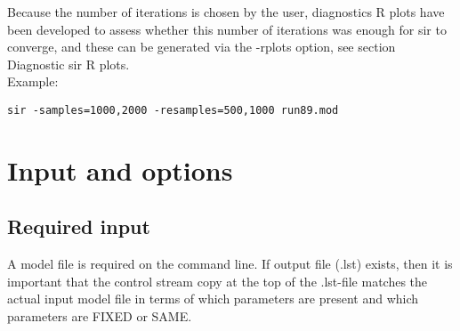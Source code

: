 Because the number of iterations is chosen by the user, diagnostics R plots have been developed to assess whether this number of iterations was enough for sir to converge, and these can be generated via the -rplots option, see section Diagnostic sir R plots.\\
Example:
\begin{verbatim}
sir -samples=1000,2000 -resamples=500,1000 run89.mod
\end{verbatim}

\section{Input and options}
\subsection{Required input}
A model file is required on the command line. If output file (.lst) exists, then it is important that the control stream copy at the top of the .lst-file matches the actual input model file in terms of which parameters are present and which parameters are FIXED or SAME.
